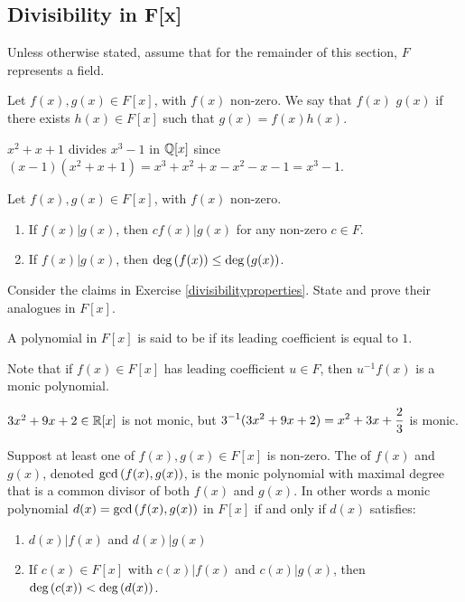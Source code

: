 \documentclass[11pt,fleqn,dvipsnames,usenames]{article}
\newcommand{\p}{\noindent}
\begin{document}
\subsection{Divisibility in F[x]}

\p Unless otherwise stated, assume that for the remainder of this section, $F$ represents a field.
%
\begin{definition}
Let $f(x),g(x)\in F[x]$, with $f(x)$ non-zero.  We say that $f(x)$  $g(x)$ if there exists $h(x)\in F[x]$ such that $g(x) = f(x)h(x)$.
\end{definition}
%
\begin{example}
$x^2 + x + 1$ divides $x^3 - 1$ in $\mathbb{Q}[x]$ since $(x-1)(x^2 + x + 1) = x^3 + x^2 + x - x^2 - x - 1 = x^3 - 1$.
\end{example}
\vsmsp

%
\begin{remarks} Let $f(x),g(x)\in F[x]$, with $f(x)$ non-zero.
\begin{enumerate}[(1)]
\item If $f(x)|g(x)$, then $cf(x)|g(x)$ for any non-zero $c\in F$.
\item If $f(x)|g(x)$, then $\text{deg}\left(f(x)\right)\leq \text{deg}\left(g(x)\right)$.
\end{enumerate}
\end{remarks}
\vsmsp

\begin{exercise}
Consider the claims in Exercise \ref{divisibilityproperties}.  State and prove their analogues in $F[x]$.
\end{exercise}
\vsmsp

\terminology A polynomial in $F[x]$ is said to be  if its leading coefficient is equal to $1$.
\vsp

\p Note that if $f(x)\in F[x]$ has leading coefficient $u\in F$, then $u^{-1}f(x)$ is a monic polynomial.
\vsp

\begin{example}
$3x^2 + 9x + 2\in\mathbb{R}[x]$ is not monic, but $\displaystyle{3^{-1}(3x^2 + 9x + 2) = x^2 + 3x + \frac{2}{3}}$ is monic.
\end{example}
%
\begin{definition}
Suppost at least one of $f(x),g(x)\in F[x]$ is non-zero.  The  of $f(x)$ and $g(x)$, denoted $\text{gcd}\left(f(x),g(x)\right)$, is the monic polynomial with maximal degree that is a common divisor of both $f(x)$ and $g(x)$.  In other words a monic polynomial $d(x) = \text{gcd}\left(f(x),g(x)\right)$ in $F[x]$ if and only if $d(x)$ satisfies:
\begin{enumerate}[(1)]
\item $d(x)|f(x)$ and $d(x)|g(x)$
\item If $c(x) \in F[x]$ with $c(x)|f(x)$ and $c(x)|g(x)$, then $\text{deg}\left(c(x)\right) < \text{deg}\left(d(x)\right)$.
\end{enumerate}
\end{definition}
\vsp
\end{document}
